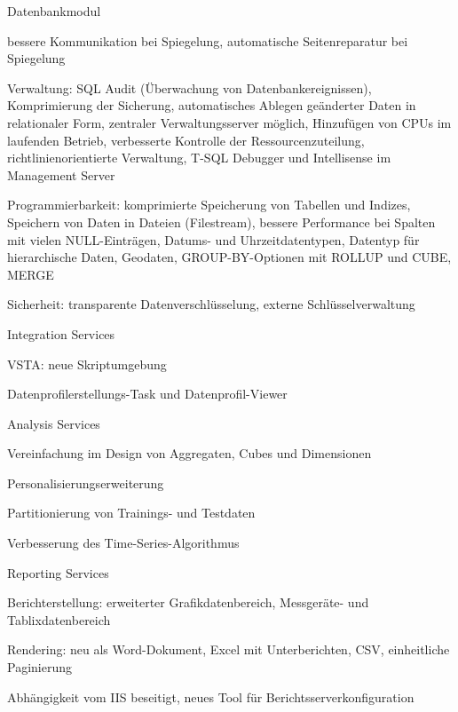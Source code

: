 \documentclass[12pt,ngerman,a4paper,index=totoc,twoside]{scrartcl}
\begin{document}
\begin{compactitem}
 \item Datenbankmodul
 
 \begin{compactitem}
  \item bessere Kommunikation bei Spiegelung, automatische Seitenreparatur bei Spiegelung
  \item Verwaltung: SQL Audit (Überwachung von Datenbankereignissen), Komprimierung der Sicherung, automatisches Ablegen geänderter Daten in relationaler Form, zentraler Verwaltungsserver möglich, Hinzufügen von CPUs im laufenden Betrieb, verbesserte Kontrolle der Ressourcenzuteilung, richtlinienorientierte Verwaltung, T-SQL Debugger und Intellisense im Management Server
  \item Programmierbarkeit: komprimierte Speicherung von Tabellen und Indizes, Speichern von Daten in Dateien (Filestream), bessere Performance bei Spalten mit vielen NULL-Einträgen, Datums- und Uhrzeitdatentypen, Datentyp für hierarchische Daten, Geodaten, GROUP-BY-Optionen mit ROLLUP und CUBE, MERGE
  \item Sicherheit: transparente Datenverschlüsselung, externe Schlüsselverwaltung
  \end{compactitem}
 
 \item Integration Services
 
 \begin{compactitem}
  \item VSTA: neue Skriptumgebung
  \item Datenprofilerstellungs-Task und Datenprofil-Viewer
  \end{compactitem}
 
 \item Analysis Services

 \begin{compactitem}
  \item Vereinfachung im Design von Aggregaten, Cubes und Dimensionen
  \item Personalisierungserweiterung
  \item Partitionierung von Trainings- und Testdaten
  \item Verbesserung des Time-Series-Algorithmus
  \end{compactitem}
 
 \item Reporting Services

 \begin{compactitem}
  \item Berichterstellung: erweiterter Grafikdatenbereich, Messgeräte- und Tablixdatenbereich
  \item Rendering: neu als Word-Dokument, Excel mit Unterberichten, CSV, einheitliche Paginierung
  \item Abhängigkeit vom IIS beseitigt, neues Tool für Berichtsserverkonfiguration
 \end{compactitem}
 
 \end{compactitem}
\end{document}
